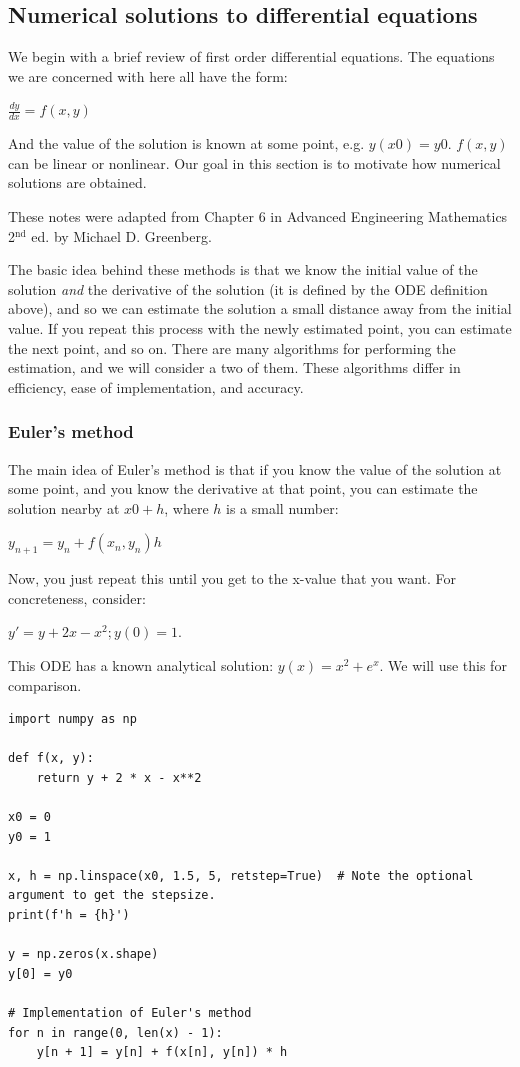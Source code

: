 \documentclass[11pt]{article}
\begin{document}
\subsection{Numerical solutions to differential equations}
\label{sec:orgee329e9}

We begin with a brief review of first order differential equations. The equations we are concerned with here all have the form:

\(\frac{dy}{dx} = f(x, y)\)

And the value of the solution is known at some point, e.g. \(y(x0) = y0\). \(f(x, y)\) can be linear or nonlinear. Our goal in this section is to motivate how numerical solutions are obtained.

These notes were adapted from Chapter 6 in Advanced Engineering Mathematics 2\(^{\text{nd}}\) ed. by Michael D. Greenberg.

The basic idea behind these methods is that we know the initial value of the solution \emph{and} the derivative of the solution (it is defined by the ODE definition above), and so we can estimate the solution a small distance away from the initial value. If you repeat this process with the newly estimated point, you can estimate the next point, and so on. There are many algorithms for performing the estimation, and we will consider a two of them. These algorithms differ in efficiency, ease of implementation, and accuracy.

\subsubsection{Euler's method}
\label{sec:org30398dc}

The main idea of Euler's method is that if you know the value of the solution at some point, and you know the derivative at that point, you can estimate the solution nearby at \(x0 + h\), where \(h\) is a small number:

\(y_{n+1} = y_n + f(x_n, y_n) h\)

Now, you just repeat this until you get to the x-value that you want. For concreteness, consider:

\(y' = y + 2x - x^2; y(0) = 1\).

This ODE has a known analytical solution: \(y(x) = x^2 + e^x\). We will use this for comparison.

\begin{verbatim}
import numpy as np

def f(x, y):
    return y + 2 * x - x**2

x0 = 0
y0 = 1

x, h = np.linspace(x0, 1.5, 5, retstep=True)  # Note the optional argument to get the stepsize.
print(f'h = {h}')

y = np.zeros(x.shape)
y[0] = y0

# Implementation of Euler's method
for n in range(0, len(x) - 1):
    y[n + 1] = y[n] + f(x[n], y[n]) * h
\end{verbatim}
\end{document}
